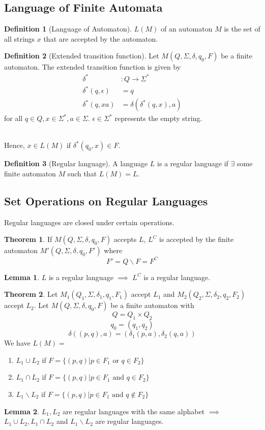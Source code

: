 \documentclass[10pt, a4paper]{extarticle}
\theoremstyle{definition}
\newtheorem{thm}{Theorem}
\newtheorem{lem}{Lemma}[thm]
\newtheorem{defn}{Definition}
\begin{document}
\subsection{Language of Finite Automata}
\begin{defn}[Language of Automaton]
	$L(M)$ of an automaton $M$ is the set of all strings $x$ that are accepted by the automaton.
\end{defn}

\begin{defn}[Extended transition function]
	Let $M(Q,\Sigma,\delta,q_0,F)$ be a finite automaton. The extended transition function is given by
	\begin{align*}
		\delta^*             & :Q\to\Sigma^*            \\
		\delta^*(q,\epsilon) & =q                       \\
		\delta^*(q,xa)       & =\delta(\delta^*(q,x),a)
	\end{align*}
	for all $q\in Q, x\in\Sigma^*, a\in\Sigma$. $\epsilon\in\Sigma^*$ represents the empty string.
\end{defn}
\hfill\\
Hence, $x\in L(M)$ if $\delta^*(q_0,x)\in F$.

\begin{defn}[Regular language]
	A language $L$ is a regular language if $\exists$ some finite automaton $M$ such that $L(M)=L$.
\end{defn}

\subsection{Set Operations on Regular Languages}
Regular languages are closed under certain operations.

\begin{thm}
	If $M(Q,\Sigma,\delta,q_0,F)$ accepts $L$, $L^C$ is accepted by the finite automaton $M'(Q,\Sigma,\delta,q_0,F')$ where \[F'=Q\backslash F=F^C\]
\end{thm}

\begin{lem}
	$L$ is a regular language $\implies$ $L^C$ is a regular language.
\end{lem}

\begin{thm}
	Let $M_1(Q_1,\Sigma,\delta_1,q_1,F_1)$ accept $L_1$ and $M_2(Q_2,\Sigma,\delta_2,q_2,F_2)$ accept $L_2$. Let $M(Q,\Sigma,\delta,q_0,F)$ be a finite automaton with
	\[Q=Q_1\times Q_2\]\[q_0=(q_1,q_2)\]\[\delta((p,q),a)=(\delta_1(p,a),\delta_2(q,a))\]
	We have $L(M)=$
	\begin{enumerate}
		\item $L_1\cup L_2$ if $F=\{(p,q)|p\in F_1\text{ or }q\in F_2\}$
		\item $L_1\cap L_2$ if $F=\{(p,q)|p\in F_1\text{ and }q\in F_2\}$
		\item $L_1\backslash L_2$ if $F=\{(p,q)|p\in F_1\text{ and }q\notin F_2\}$
\end{enumerate}
\end{thm}
\begin{lem}
	$L_1,L_2$ are regular languages with the same alphabet $\implies$ $L_1\cup L_2, L_1\cap L_2$ and $L_1\backslash L_2$ are regular languages.
\end{lem}
\end{document}
